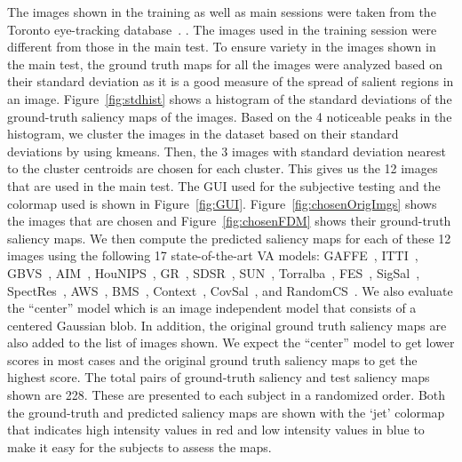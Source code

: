\documentclass[12pt,onecolumn,journal,	draftclsnofoot]{IEEEtran}
\begin{document}
The images shown in the training as well as main sessions were taken from the  Toronto eye-tracking database~\cite{AIM}. . The images used in the training session were different from those in the main test. To ensure variety in the images shown in the main test, the ground truth maps for all the images were analyzed based on their standard deviation as it is a good measure of the spread of salient regions in an image. Figure~\ref{fig:stdhist} shows a histogram of the standard deviations of the ground-truth saliency maps of the images. Based on the 4 noticeable peaks in the histogram, we cluster the images in the dataset based on their standard deviations by using kmeans. Then, the 3 images with standard deviation nearest to the cluster centroids are chosen for each cluster. This gives us the 12 images that are used in the main test. The GUI used for the subjective testing and the colormap used is shown in Figure~\ref{fig:GUI}. Figure~\ref{fig:chosenOrigImgs} shows the images that are chosen and Figure~\ref{fig:chosenFDM} shows their ground-truth saliency maps. We then compute the predicted saliency maps for each of these 12 images using the following 17 state-of-the-art VA models:  GAFFE~\cite{GAFFE}, ITTI~\cite{Itti}, GBVS~\cite{GBVS}, AIM~\cite{AIM},  HouNIPS~\cite{HouNIPS}, GR~\cite{GR}, SDSR~\cite{SDSR}, SUN~\cite{SUN}, 
Torralba~\cite{AudeTorralba},      
FES~\cite{FES}, SigSal~\cite{SigSal}, SpectRes~\cite{SpectRes},
AWS~\cite{AWS}, BMS~\cite{BMS}, Context~\cite{Context}, CovSal~\cite{CovSal},
and RandomCS~\cite{RandomCS}. We also evaluate the ``center''  model which is an image independent model that consists of a centered Gaussian blob. In addition, the original ground truth saliency maps are also added to the list of images shown. We expect the ``center'' model to get lower scores in most cases and the original ground truth saliency maps to get the highest score. The total pairs of ground-truth saliency and test saliency maps shown are 228. These are presented to each subject in a randomized order.  Both the ground-truth and predicted saliency maps are shown with the `jet' colormap that indicates high intensity values in red and low intensity values in blue to make it easy for the subjects to assess the maps. 
\end{document}
